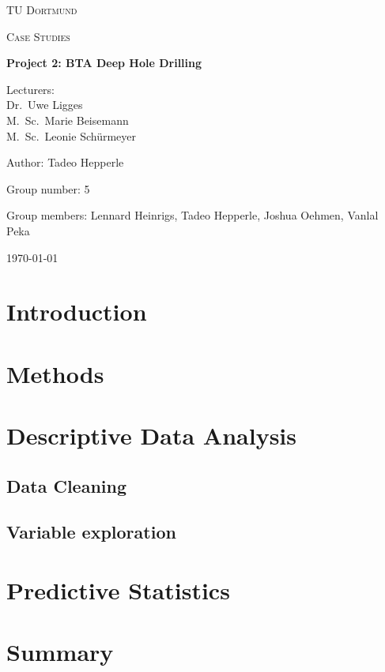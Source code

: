 \documentclass[12 pt]{scrartcl}
\begin{document}
\begin{titlepage}
  \centering
  {\scshape\LARGE TU Dortmund \par}
  \vspace{1cm}
  {\scshape\Large Case Studies \par}
  \vspace{2cm}
  {\huge\bfseries Project 2: BTA Deep Hole Drilling\par}
  \vspace{2cm}
  {\Large Lecturers:\\
    Dr.\ Uwe Ligges \\
    M.\ Sc.\ Marie Beisemann\\
    M.\ Sc.\ Leonie Schürmeyer \par}
  \vspace{1cm}
  {\Large Author: Tadeo Hepperle \par}
  \vspace{0.5 cm}
  {\Large Group number: 5\par}
  \vspace{0.5 cm}
  {\Large Group members: Lennard Heinrigs, Tadeo Hepperle, Joshua Oehmen, Vanlal Peka}
  \vfill
  {\large \today\par}
\end{titlepage}

\tableofcontents

\cleardoublepage

\section{Introduction}


\section{Methods}

\section{Descriptive Data Analysis}

\subsection{Data Cleaning}

\subsection{Variable exploration}

\section{Predictive Statistics}


\section{Summary}

\newpage
{}
\renewcommand\refname{Bibliography}


\end{document}
